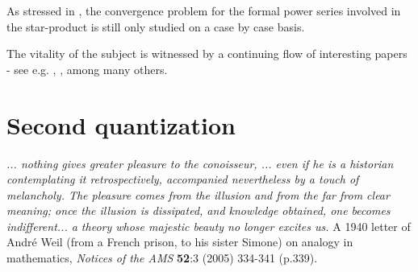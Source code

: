 \documentclass[12pt]{article}
\begin{document}
As stressed in \cite{GW}, the convergence problem for the formal power series involved in the star-product 
is still only studied on a case by case basis.

The vitality of the subject is witnessed by a continuing flow of interesting papers - see e.g. \cite{C07}, \cite{CFR}, \cite{LW} among many others.
\bigskip

\section{Second quantization}
\setcounter{equation}{0}
\renewcommand\theequation{\thesection.\arabic{equation}}

\hfill\begin{minipage}{.7\linewidth}
{\it ... nothing gives greater pleasure to the conoisseur, ... even if he is a historian contemplating it retrospectively,
accompanied nevertheless by a touch of melancholy. The pleasure comes from the illusion and from the far from clear meaning;
once the illusion is dissipated, and knowledge obtained, one becomes indifferent... a theory whose majestic beauty no longer 
excites us.} A 1940 letter of Andr\'e Weil (from a French prison, to his sister Simone) on analogy in mathematics, 
{\it Notices of the AMS} {\bf 52}:3 (2005) 334-341 (p.339).
\end{minipage}

\smallskip
\end{document}
